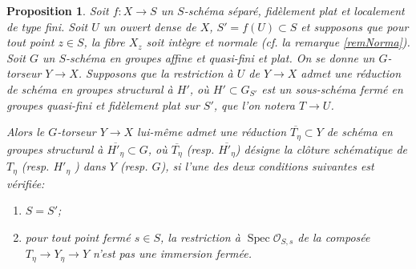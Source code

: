 \documentclass[11pt]{amsart}
\numberwithin{equation}{section}
\newtheorem{prop}[thm]{Proposition}
\theoremstyle{definition}
\theoremstyle{remark}
\newcommand{\dO}{{\mathcal O}}
\DeclareMathOperator{\Spec}{Spec}
\begin{document}
\begin{prop}\label{lemQF} Soit $f:X\to S$ un $S$-sch\'ema s\'epar\'e, fid\`element plat et localement de type fini. Soit $U$ un ouvert dense de $X$, $S'=f(U)\subset S$ et supposons que pour tout point $z\in S$, la fibre
$X_z$ soit int\`egre et normale (cf. la remarque \ref{remNorma}). Soit $G$ un $S$-sch\'ema en groupes affine et quasi-fini et plat. On se donne un $G$-torseur $Y \to X$. Supposons que la restriction \`a $U$ de $Y \to X$ admet une r\'eduction de sch\'ema en groupes structural \`a $H'$, o\`u $H' \subset G_{S'}$ est un sous-sch\'ema ferm\'e en groupes quasi-fini et fid\`element plat sur $S'$, que l'on notera $T \to U$.

Alors le $G$-torseur $Y \to X$ lui-m\^eme admet une r\'eduction $\overline {T_\eta } \subset Y$ de sch\'ema en groupes structural \`a $\overline {H'_\eta } \subset G$, o\`u $\overline {T_\eta } $ (resp. $\overline {H'_\eta }$) d\'esigne la cl\^oture sch\'ematique de $T_\eta $ (resp. $H'_\eta $ ) dans $Y$ (resp. $G$), si l'une des deux conditions suivantes est v\'erifi\'ee:

\begin{enumerate}
\item $S=S'$;
\item pour tout point ferm\'e $s \in S$, la restriction \`a $\Spec \dO _{S,s}$ de la compos\'ee $T_{\eta} \to Y_{\eta}\to  Y$ n'est pas une immersion ferm\'ee.
\end{enumerate}
 \end{prop}
\end{document}
